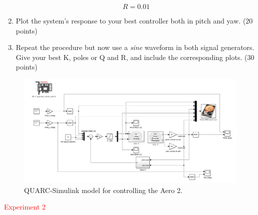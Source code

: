 \documentclass[11pt]{article}
\begin{document}
\begin{enumerate}
\[R=0.01\]

\vspace{1cm} %


\newpage
    
    \item Plot the system's response to your best controller both in pitch and yaw. (20 points)
    \vspace{9 cm}
    
     \item Repeat the procedure but now use a \textit{sine} waveform in both signal generators. Give your best K, poles or Q and R, and include the corresponding plots. (30 points)

\newpage

    

    \vspace{7 cm}
    
    
\end{enumerate}


\begin{figure}[ht!]
  \centering
  \includegraphics[width=5in]{simulink_q.jpg}
  \caption{QUARC-Simulink model for controlling the Aero 2.}
  \label{fig:simulinkq}
\end{figure}


\noindent \textcolor{red}{{\huge  Experiment 2}}
\vspace{0.5 cm}
\end{document}
